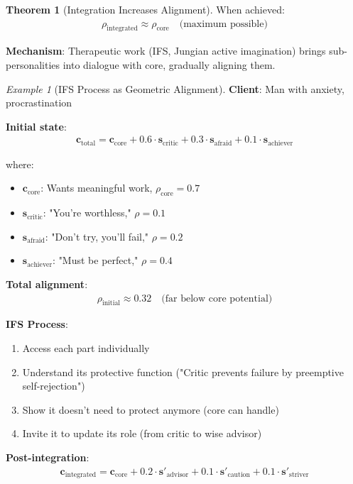 \documentclass[11pt,a4paper]{article}
\theoremstyle{definition}
\newtheorem{theorem}{Theorem}[section]
\theoremstyle{remark}
\newtheorem{example}{Example}[section]
\newcommand{\cc}{\mathbf{c}}
\begin{document}
\begin{enumerate}
\begin{theorem}[Integration Increases Alignment]
When achieved:
\begin{align}
\rho_{\text{integrated}} \approx \rho_{\text{core}} \quad \text{(maximum possible)}
\end{align}

\textbf{Mechanism}: Therapeutic work (IFS, Jungian active imagination) brings sub-personalities into dialogue with core, gradually aligning them.
\end{theorem}

\begin{example}[IFS Process as Geometric Alignment]
\textbf{Client}: Man with anxiety, procrastination

\textbf{Initial state}:
\begin{align}
\cc_{\text{total}} = \cc_{\text{core}} + 0.6 \cdot \mathbf{s}_{\text{critic}} + 0.3 \cdot \mathbf{s}_{\text{afraid}} + 0.1 \cdot \mathbf{s}_{\text{achiever}}
\end{align}

where:
\begin{itemize}
    \item \(\cc_{\text{core}}\): Wants meaningful work, \(\rho_{\text{core}} = 0.7\)
    \item \(\mathbf{s}_{\text{critic}}\): "You're worthless," \(\rho = 0.1\)
    \item \(\mathbf{s}_{\text{afraid}}\): "Don't try, you'll fail," \(\rho = 0.2\)
    \item \(\mathbf{s}_{\text{achiever}}\): "Must be perfect," \(\rho = 0.4\)
\end{itemize}

\textbf{Total alignment}:
\begin{align}
\rho_{\text{initial}} \approx 0.32 \quad \text{(far below core potential)}
\end{align}

\textbf{IFS Process}:
\begin{enumerate}
    \item Access each part individually
    \item Understand its protective function ("Critic prevents failure by preemptive self-rejection")
    \item Show it doesn't need to protect anymore (core can handle)
    \item Invite it to update its role (from critic to wise advisor)
\end{enumerate}

\textbf{Post-integration}:
\begin{align}
\cc_{\text{integrated}} = \cc_{\text{core}} + 0.2 \cdot \mathbf{s}'_{\text{advisor}} + 0.1 \cdot \mathbf{s}'_{\text{caution}} + 0.1 \cdot \mathbf{s}'_{\text{striver}}
\end{align}


\end{example}
\end{enumerate}
\end{document}
